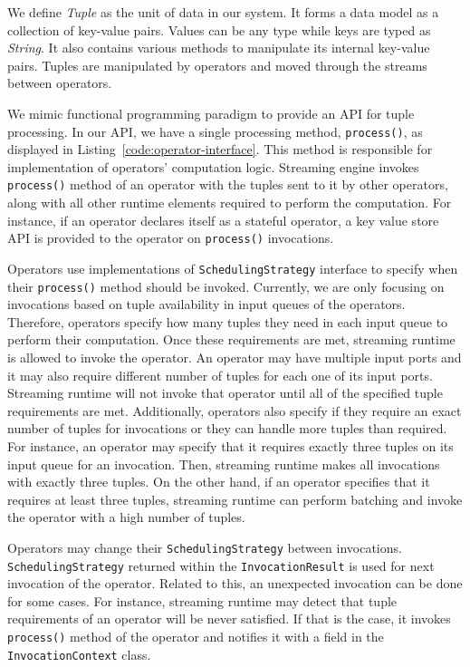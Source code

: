 We define \textit{Tuple} as the unit of data in our system. It forms a data model as a collection of key-value pairs. Values can be any type while keys are typed as \textit{String}. It also contains various methods to manipulate its internal key-value pairs. Tuples are manipulated by operators and moved through the streams between operators.

We mimic functional programming paradigm to provide an API for tuple processing. In our API, we have a single processing method, \texttt{process()}, as displayed in Listing~\ref{code:operator-interface}. This method is responsible for implementation of operators' computation logic. Streaming engine invokes \texttt{process()} method of an operator with the tuples sent to it by other operators, along with all other runtime elements required to perform the computation. For instance, if an operator declares itself as a stateful operator, a key value store API is provided to the operator on \texttt{process()} invocations. 

Operators use implementations of \texttt{SchedulingStrategy} interface to specify when their \texttt{process()} method should be invoked. Currently, we are only focusing on invocations based on tuple availability in input queues of the operators. Therefore, operators specify how many tuples they need in each input queue to perform their computation. Once these requirements are met, streaming runtime is allowed to invoke the operator. An operator may have multiple input ports and it may also require different number of tuples for each one of its input ports. Streaming runtime will not invoke that operator until all of the specified tuple requirements are met. Additionally, operators also specify if they require an exact number of tuples for invocations or they can handle more tuples than required. For instance, an operator may specify that it requires exactly three tuples on its input queue for an invocation. Then, streaming runtime makes all invocations with exactly three tuples. On the other hand, if an operator specifies that it requires at least three tuples, streaming runtime can perform batching and invoke the operator with a high number of tuples. 

Operators may change their \texttt{SchedulingStrategy} between invocations. \texttt{SchedulingStrategy} returned within the \texttt{InvocationResult} is used for next invocation of the operator. Related to this, an unexpected invocation can be done for some cases. For instance, streaming runtime may detect that tuple requirements of an operator will be never satisfied. If that is the case, it invokes \texttt{process()} method of the operator and notifies it with a field in the \texttt{InvocationContext} class.

